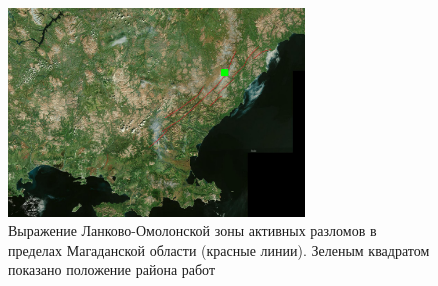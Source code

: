 \begin{figure}[H]
  \begin{center}
    \includegraphics[width=0.7\textwidth]{authors/kondratev-fig1.png}
  \end{center}
  \caption {
	  Выражение Ланково-Омолонской зоны активных разломов в пределах Магаданской области (красные линии). Зеленым квадратом показано положение района работ
}

\end{figure}
